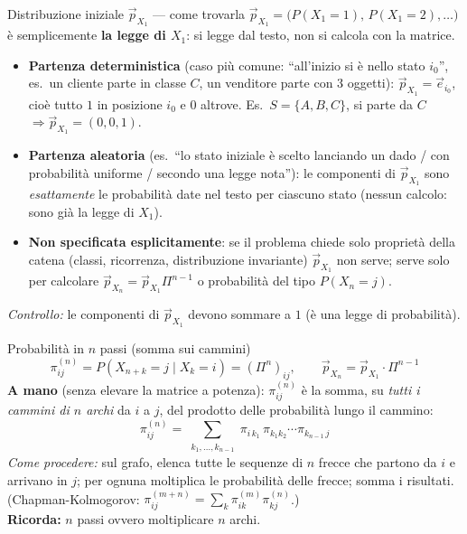 \documentclass[11pt]{article}
\begin{document}
\begin{concetto}[barPurple]{Distribuzione iniziale $\vec p_{X_1}$ --- come trovarla}
$\vec p_{X_1}=\big(P(X_1{=}1),\,P(X_1{=}2),\dots\big)$ \`e semplicemente \textbf{la legge di $X_1$}: si legge dal testo, non si calcola con la matrice.
\begin{itemize}[leftmargin=1.2em,itemsep=2pt,topsep=2pt]
\item \textbf{Partenza deterministica} (caso pi\`u comune: ``all'inizio si \`e nello stato $i_0$'', es.\ un cliente parte in classe $C$, un venditore parte con $3$ oggetti): $\vec p_{X_1}=\vec e_{i_0}$, cio\`e tutto $1$ in posizione $i_0$ e $0$ altrove. Es.\ $S=\{A,B,C\}$, si parte da $C$ $\Rightarrow \vec p_{X_1}=(0,0,1)$.
\item \textbf{Partenza aleatoria} (es.\ ``lo stato iniziale \`e scelto lanciando un dado / con probabilit\`a uniforme / secondo una legge nota''): le componenti di $\vec p_{X_1}$ sono \emph{esattamente} le probabilit\`a date nel testo per ciascuno stato (nessun calcolo: sono gi\`a la legge di $X_1$).
\item \textbf{Non specificata esplicitamente}: se il problema chiede solo propriet\`a della catena (classi, ricorrenza, distribuzione invariante) $\vec p_{X_1}$ non serve; serve solo per calcolare $\vec p_{X_n}=\vec p_{X_1}\Pi^{n-1}$ o probabilit\`a del tipo $P(X_n=j)$.
\end{itemize}
\emph{Controllo:} le componenti di $\vec p_{X_1}$ devono sommare a $1$ (\`e una legge di probabilit\`a).
\end{concetto}

\begin{concetto}[barPurple]{Probabilit\`a in $n$ passi (somma sui cammini)}
\[ \pi_{ij}^{(n)} = P(X_{n+k}=j\mid X_k=i) = (\Pi^n)_{ij}, \qquad \vec p_{X_n} = \vec p_{X_1}\cdot\Pi^{n-1} \]
\textbf{A mano} (senza elevare la matrice a potenza): $\pi_{ij}^{(n)}$ \`e la somma, su \emph{tutti i cammini di $n$ archi} da $i$ a $j$, del prodotto delle probabilit\`a lungo il cammino:
\[ \pi_{ij}^{(n)} = \sum_{\substack{k_1,\dots,k_{n-1}}} \pi_{i\,k_1}\,\pi_{k_1 k_2}\cdots \pi_{k_{n-1}\,j} \]
\emph{Come procedere:} sul grafo, elenca tutte le sequenze di $n$ frecce che partono da $i$ e arrivano in $j$; per ognuna moltiplica le probabilit\`a delle frecce; somma i risultati. (Chapman-Kolmogorov: $\pi_{ij}^{(m+n)}=\sum_k \pi_{ik}^{(m)}\pi_{kj}^{(n)}$.)\\
\textbf{Ricorda: } $n$ passi ovvero moltiplicare $n$ archi.
\end{concetto}
\end{document}
